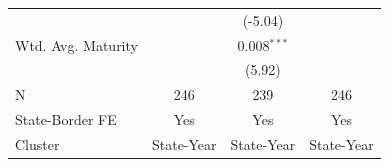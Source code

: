 \begin{tabular*}{\textwidth}{@{\extracolsep{\fill}}lccc}
                              &                & (-5.04)                    &   \\   
   Wtd. Avg. Maturity         &                & 0.008$^{***}$               &   \\   
                              &                & (5.92)                     &   \\   
   \hline
   N               & 246            & 239                         & 246\\  
   State-Border FE            & Yes            & Yes                         & Yes\\  
   Cluster              & State-Year & State-Year & State-Year\\  
   \bottomrule
\end{tabular*}
\par\endgroup
